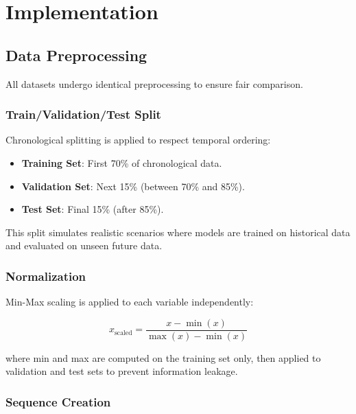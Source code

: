 \documentclass[conference]{IEEEtran}
\begin{document}

\section{Implementation}
\label{sec:implementation}

\subsection{Data Preprocessing}

All datasets undergo identical preprocessing to ensure fair
comparison.

\subsubsection{Train/Validation/Test Split}

Chronological splitting is applied to respect temporal ordering:

\begin{itemize}
    \item \textbf{Training Set}: First 70\% of chronological data.
    \item \textbf{Validation Set}: Next 15\% (between 70\% and 85\%).
    \item \textbf{Test Set}: Final 15\% (after 85\%).
\end{itemize}

This split simulates realistic scenarios where models are trained on
historical data and evaluated on unseen future data.

\subsubsection{Normalization}

Min-Max scaling is applied to each variable independently:

\begin{equation}
x_{\text{scaled}} =
\frac{x - \min(x)}
{\max(x) - \min(x)}
\end{equation}

where min and max are computed on the training set only, then applied
to validation and test sets to prevent information leakage.

\subsubsection{Sequence Creation}
\end{document}

